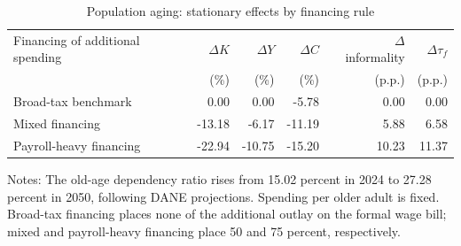 \begin{table}[!htbp]
\centering
\caption{Population aging: stationary effects by financing rule}
\label{tab:steady_results}
\begin{threeparttable}
\begin{tabular}{lrrrrr}
\toprule
Financing of additional spending & $\Delta K$ & $\Delta Y$ & $\Delta C$ & $\Delta$ informality & $\Delta\tau_f$ \\
 & (\%) & (\%) & (\%) & (p.p.) & (p.p.) \\
\midrule
Broad-tax benchmark & 0.00 & 0.00 & -5.78 & 0.00 & 0.00 \\
Mixed financing & -13.18 & -6.17 & -11.19 & 5.88 & 6.58 \\
Payroll-heavy financing & -22.94 & -10.75 & -15.20 & 10.23 & 11.37 \\
\bottomrule
\end{tabular}
\begin{tablenotes}[flushleft]\footnotesize
\item Notes: The old-age dependency ratio rises from 15.02 percent in 2024 to 27.28 percent in 2050, following DANE projections. Spending per older adult is fixed. Broad-tax financing places none of the additional outlay on the formal wage bill; mixed and payroll-heavy financing place 50 and 75 percent, respectively.
\end{tablenotes}
\end{threeparttable}
\end{table}
